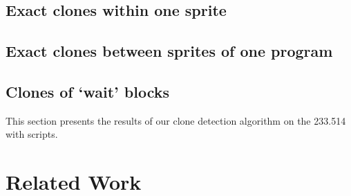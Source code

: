 \documentclass[times,10pt,twocolumn]{article}
\newcommand{\nScriptPrograms}{233.514}
\begin{document}
\subsection{Exact clones within one sprite}

\subsection{Exact clones between sprites of one program}

\subsection{Clones of `wait' blocks}

This section presents the results of our clone detection algorithm on the \nScriptPrograms~ with scripts.



\section{Related Work}





\end{document}
